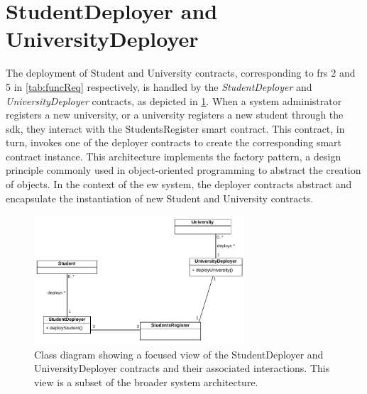 \section{StudentDeployer and UniversityDeployer}
The deployment of Student and University contracts, corresponding to \glspl{fr} 2 and 5 in \cref{tab:funcReq} respectively, is handled by the \textit{StudentDeployer} and \textit{UniversityDeployer} contracts, as depicted in \cref{fig:deployersContractClass}. When a system administrator registers a new university, or a university registers a new student through the \acrshort{sdk}, they interact with the StudentsRegister smart contract. This contract, in turn, invokes one of the deployer contracts to create the corresponding smart contract instance. This architecture implements the factory pattern, a design principle commonly used in object-oriented programming to abstract the creation of objects. In the context of the \gls{ew} system, the deployer contracts abstract and encapsulate the instantiation of new Student and University contracts.
\begin{figure}
  \centering
  \includegraphics[width=0.7\textwidth]{figures/Deployers class diagram.pdf}
  \caption[Class diagram focused on StudentDeployer and UniversityDeployer contracts]{Class diagram showing a focused view of the StudentDeployer and UniversityDeployer contracts and their associated interactions. This view is a subset of the broader system architecture.}
  \label{fig:deployersContractClass}
\end{figure}

